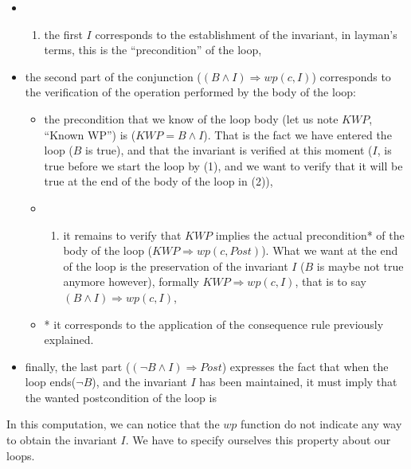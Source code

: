 \documentclass[middle]{zmdocument}
\begin{document}
\begin{itemize}
\item
  \begin{enumerate}
  \def\labelenumi{(\arabic{enumi})}
  \item
    the first $I$ corresponds to the establishment of the invariant,
    in layman's terms, this is the ``precondition'' of the loop,
  \end{enumerate}
\item
  the second part of the conjunction
  ($(B \wedge I) \Rightarrow wp(c, I)$) corresponds to the
  verification of the operation performed by the body of the loop:

  \begin{itemize}
  \item
    the precondition that we know of the loop body (let us note $KWP$,
    ``Known WP'') is ($KWP = B \wedge I$). That is the fact we have
    entered the loop ($B$ is true), and that the invariant is verified
    at this moment ($I$, is true before we start the loop by (1), and
    we want to verify that it will be true at the end of the body of the
    loop in (2)),
  \item
    \begin{enumerate}
    \def\labelenumi{(\arabic{enumi})}
    \setcounter{enumi}{1}
    \item
      it remains to verify that $KWP$ implies the actual precondition*
      of the body of the loop ($KWP \Rightarrow wp(c, Post)$). What we
      want at the end of the loop is the preservation of the invariant
      $I$ ($B$ is maybe not true anymore however), formally
      $KWP \Rightarrow wp(c, I)$, that is to say
      $(B \wedge I) \Rightarrow wp(c, I)$,
    \end{enumerate}
  \item
    * it corresponds to the application of the consequence rule
    previously explained.
  \end{itemize}
\item
  finally, the last part ($(\neg B \wedge I) \Rightarrow Post$)
  expresses the fact that when the loop ends($\neg B$), and the
  invariant $I$ has been maintained, it must imply that the wanted
  postcondition of the loop is
\end{itemize}

In this computation, we can notice that the $wp$ function do not
indicate any way to obtain the invariant $I$. We have to specify
ourselves this property about our loops.
\end{document}

